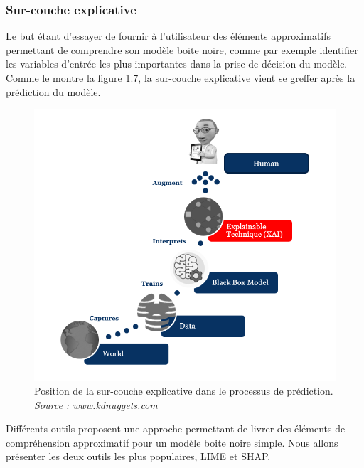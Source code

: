 \subsubsection{Sur-couche explicative}
Le but étant d'essayer de fournir à l'utilisateur des éléments approximatifs permettant de comprendre son modèle boite noire, comme par exemple identifier les variables d'entrée les plus importantes dans la prise de décision du modèle. Comme le montre la figure 1.7, la sur-couche explicative vient se greffer après la prédiction du modèle.
\begin{figure}[h]
\centering
\includegraphics[scale=0.35]{src_img/explainCouche.png}
\caption{Position de la sur-couche explicative dans le processus de prédiction. \textit{Source : www.kdnuggets.com}}
\label{explainCouche}
\end{figure}
Différents outils proposent une approche permettant de livrer des éléments de compréhension approximatif pour un modèle boite noire simple. Nous allons présenter les deux outils les plus populaires, LIME et SHAP.
